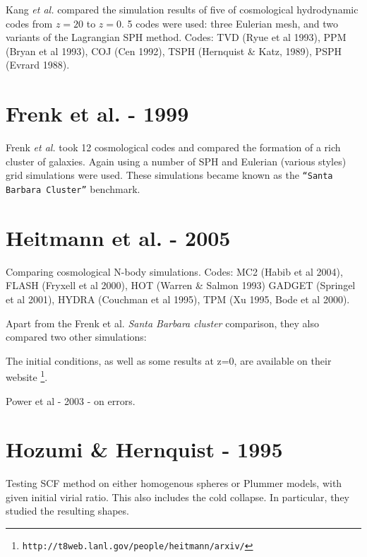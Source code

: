 {%

Kang {\it et al. } compared the simulation results of five
of cosmological hydrodynamic codes from $z=20$ to $z=0$. 5 codes
were used: three Eulerian mesh, and two variants of the
Lagrangian SPH method.
Codes: 
TVD (Ryue et al 1993),
PPM (Bryan et al 1993),
COJ (Cen 1992),
TSPH (Hernquist \& Katz, 1989),
PSPH (Evrard 1988).


\section{Frenk  et al. - 1999}

Frenk {\it et al. } took 12 cosmological codes and compared the
formation of a rich cluster of galaxies.
Again using a number of SPH and
Eulerian (various styles) grid simulations were used.
\smallskip
These simulations became known as the {\tt ``Santa Barbara Cluster''}
benchmark.

\section{Heitmann et al. - 2005}

Comparing cosmological N-body simulations. Codes:
MC2 (Habib et al 2004), %
FLASH (Fryxell et al 2000),
HOT (Warren \& Salmon 1993) %
GADGET (Springel et al 2001),
HYDRA (Couchman et al 1995),
TPM (Xu 1995, Bode et al 2000).

Apart from the Frenk et al. {\it Santa Barbara cluster} comparison, they
also compared two other simulations:

The initial conditions, as well as some results at z=0, are available
on their 
website \footnote{{\tt http://t8web.lanl.gov/people/heitmann/arxiv/}}.

Power et al - 2003 - on errors.


\section{Hozumi \& Hernquist - 1995}

Testing SCF method on either homogenous spheres or Plummer models, with
given initial virial ratio. This also includes the cold collapse. In
particular, they studied the resulting shapes.

}
